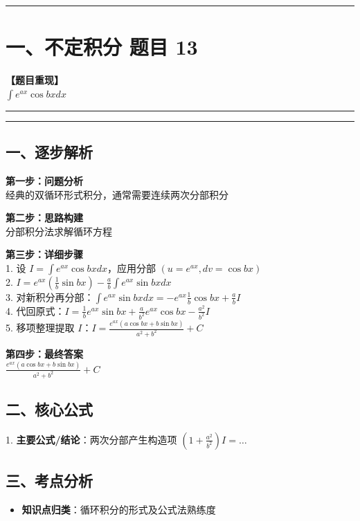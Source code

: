 ﻿\documentclass[12pt, a4paper]{ctexart}
\newcommand{\TopSeparator}{
    \par\noindent\rule{\textwidth}{1.5pt}\vspace{0.5em}
}
\newcommand{\AnalysisSeparator}{
    \par\noindent\rule{\textwidth}{0.5pt}\vspace{0.2em}\hrule\vspace{0.5em}
}
\newenvironment{RedAnalysis}{
    \par
    \color{red} 
}{
    \par
    \color{black} 
}
\begin{document}
\vspace{2em}

\TopSeparator
\section*{一、不定积分 题目 13}

\textbf{【题目重现】} \\
$\int e^{ax} \cos bx dx$

\AnalysisSeparator

\begin{RedAnalysis}

	\subsection*{一、逐步解析}

	\textbf{第一步：问题分析} \\
	经典的双循环形式积分，通常需要连续两次分部积分

	\textbf{第二步：思路构建} \\
	分部积分法求解循环方程

	\textbf{第三步：详细步骤} \\
	1. 设 $I = \int e^{ax} \cos bx dx$，应用分部 $(u=e^{ax}, dv=\cos bx)$ \\ 
	2. $I = e^{ax}(\frac{1}{b}\sin bx) - \frac{a}{b} \int e^{ax}\sin bx dx$ \\ 
	3. 对新积分再分部：$\int e^{ax}\sin bx dx = -e^{ax}\frac{1}{b}\cos bx + \frac{a}{b} I$ \\ 
	4. 代回原式：$I = \frac{1}{b}e^{ax}\sin bx + \frac{a}{b^2}e^{ax}\cos bx - \frac{a^2}{b^2} I$ \\ 
	5. 移项整理提取 $I$：$I = \frac{e^{ax}(a\cos bx + b\sin bx)}{a^2+b^2} + C$

	\textbf{第四步：最终答案} \\
	$\frac{e^{ax}(a\cos bx + b\sin bx)}{a^2+b^2} + C$

	\subsection*{二、核心公式}
	1. \textbf{主要公式/结论}：$\text{两次分部产生构造项 } (1+\frac{a^2}{b^2})I = \dots$

	\subsection*{三、考点分析}
	\begin{itemize}
		\item \textbf{知识点归类}：循环积分的形式及公式法熟练度
	\end{itemize}

\end{RedAnalysis}
\end{document}
